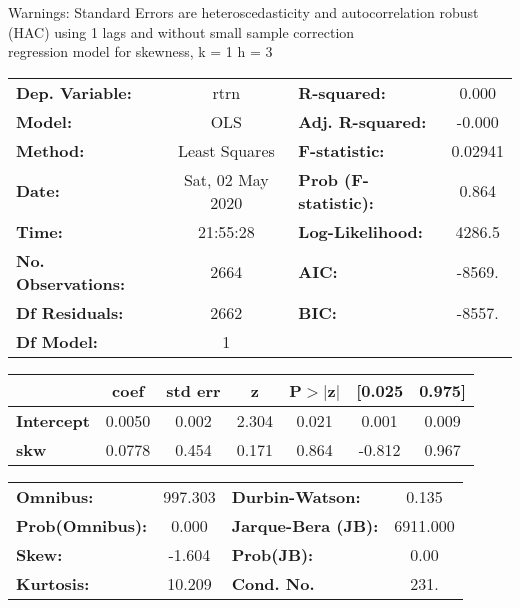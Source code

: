 Warnings: \newline
 [1] Standard Errors are heteroscedasticity and autocorrelation robust (HAC) using 1 lags and without small sample correction\\ 

regression model for skewness, k = 1 h = 3\begin{center}
\begin{tabular}{lclc}
\toprule
\textbf{Dep. Variable:}    &       rtrn       & \textbf{  R-squared:         } &     0.000   \\
\textbf{Model:}            &       OLS        & \textbf{  Adj. R-squared:    } &    -0.000   \\
\textbf{Method:}           &  Least Squares   & \textbf{  F-statistic:       } &   0.02941   \\
\textbf{Date:}             & Sat, 02 May 2020 & \textbf{  Prob (F-statistic):} &    0.864    \\
\textbf{Time:}             &     21:55:28     & \textbf{  Log-Likelihood:    } &    4286.5   \\
\textbf{No. Observations:} &        2664      & \textbf{  AIC:               } &    -8569.   \\
\textbf{Df Residuals:}     &        2662      & \textbf{  BIC:               } &    -8557.   \\
\textbf{Df Model:}         &           1      & \textbf{                     } &             \\
\bottomrule
\end{tabular}
\begin{tabular}{lcccccc}
                   & \textbf{coef} & \textbf{std err} & \textbf{z} & \textbf{P$> |$z$|$} & \textbf{[0.025} & \textbf{0.975]}  \\
\midrule
\textbf{Intercept} &       0.0050  &        0.002     &     2.304  &         0.021        &        0.001    &        0.009     \\
\textbf{skw}       &       0.0778  &        0.454     &     0.171  &         0.864        &       -0.812    &        0.967     \\
\bottomrule
\end{tabular}
\begin{tabular}{lclc}
\textbf{Omnibus:}       & 997.303 & \textbf{  Durbin-Watson:     } &    0.135  \\
\textbf{Prob(Omnibus):} &   0.000 & \textbf{  Jarque-Bera (JB):  } & 6911.000  \\
\textbf{Skew:}          &  -1.604 & \textbf{  Prob(JB):          } &     0.00  \\
\textbf{Kurtosis:}      &  10.209 & \textbf{  Cond. No.          } &     231.  \\
\bottomrule
\end{tabular}
\end{center}

